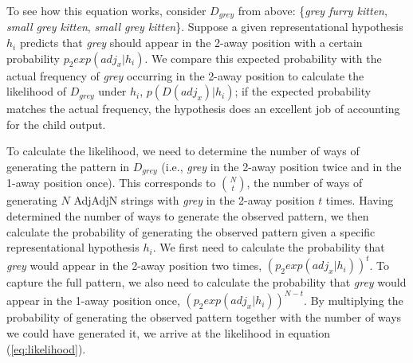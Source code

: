 \documentclass[10pt]{article}
\newcommand{\gcs}[1]{\textcolor{blue}{[gcs: #1]}}
\newcommand{\gkb}[1]{\textcolor{magenta}{[gkb: #1]}}
\begin{document}
To see how this equation works, consider $D_{grey}$ from above: \{\textit{grey furry kitten}, \textit{small grey kitten}, \emph{small grey kitten}\}. Suppose a given representational hypothesis $h_i$ predicts that \emph{grey} should appear in the 2-away position with a certain probability $p_2exp(adj_x|h_i)$. %
We compare this expected probability with the actual frequency of \emph{grey} occurring in the 2-away position to calculate the likelihood of $D_{grey}$ under $h_i$, $p(D(adj_x)|h_i)$; if the expected probability matches the actual frequency, the hypothesis does an excellent job of accounting for the child output. 

To calculate the likelihood, we need to determine the number of ways of generating the pattern in $D_{grey}$ (i.e., \textit{grey} in the 2-away position twice and in the 1-away position once). This corresponds to $\binom{N}{t}$, the number of ways of generating $N$ AdjAdjN strings with \emph{grey} in the 2-away position $t$ times. Having determined the number of ways to generate the observed pattern, we then calculate the probability of generating the observed pattern given a specific representational hypothesis $h_i$. We first need to calculate the probability that \emph{grey} would appear in the 2-away position two times, $(p_2exp(adj_x|h_i))^t$. %
To capture the full pattern, we also need to calculate the probability that \emph{grey} would appear in the 1-away position once, $(p_2exp(adj_x|h_i))^{N-t}$. By multiplying the probability of generating the observed pattern together with the number of ways we could have generated it, we arrive at the likelihood in equation (\ref{eq:likelihood}).

\end{document}
